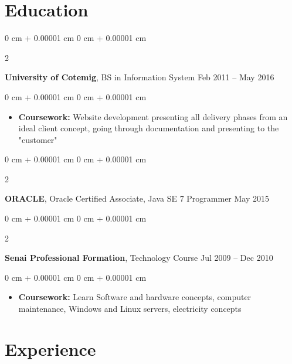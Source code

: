 \documentclass[10pt, letterpaper]{article}
\newenvironment{highlights}{
    \begin{itemize}[
        topsep=0.10 cm,
        parsep=0.10 cm,
        partopsep=0pt,
        itemsep=0pt,
        leftmargin=0 cm + 10pt
    ]
}{
    \end{itemize}
} %
\newenvironment{onecolentry}{
    \begin{adjustwidth}{
        0 cm + 0.00001 cm
    }{
        0 cm + 0.00001 cm
    }
}{
    \end{adjustwidth}
} %
\newenvironment{twocolentry}[2][]{
    \onecolentry
    \def\secondColumn{#2}
    \setcolumnwidth{\fill, 4.5 cm}
    \begin{paracol}{2}
}{
    \switchcolumn \raggedleft \secondColumn
    \end{paracol}
    \endonecolentry
} %
\begin{document}
    \section{Education}



        
        \begin{twocolentry}{
            Feb 2011 – May 2016
        }
            \textbf{University of Cotemig}, BS in Information System\end{twocolentry}

        \vspace{0.10 cm}
        \begin{onecolentry}
            \begin{highlights}
                \item \textbf{Coursework:} Website development presenting all delivery phases from an ideal client concept, going through documentation and presenting to the "customer"
            \end{highlights}
        \end{onecolentry}

        \vspace{0.15 cm}
        \begin{twocolentry}{
            May 2015
        }
            \textbf{ORACLE}, Oracle Certified Associate, Java SE 7 Programmer\end{twocolentry}
            
        \vspace{0.15 cm}

        \begin{twocolentry}{
            Jul 2009 – Dec 2010
        }
            \textbf{Senai Professional Formation}, Technology Course\end{twocolentry}

        \vspace{0.10 cm}
        \begin{onecolentry}
            \begin{highlights}
                \item \textbf{Coursework:} Learn Software and hardware concepts, computer maintenance, Windows and Linux servers, electricity concepts
            \end{highlights}
        \end{onecolentry}

        
    \section{Experience}
\end{document}
